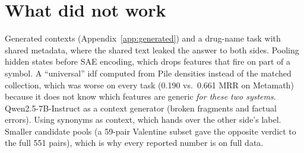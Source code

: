 \documentclass[11pt]{article}
\newcommand{\method}{SAE\mbox{-}IDF\xspace}
\begin{document}
\begin{table}[H]
  \centering\scriptsize
  \setlength{\tabcolsep}{3.5pt}
  
  \caption{Paired bootstrap over queries (10,000 resamples): mean difference \method minus baseline, 95\% interval, and one-sided bootstrap $p$-value. Valentine has no string baseline.}
  \label{tab:significance}
\end{table}

\begin{table}[H]
  \centering\scriptsize
  \setlength{\tabcolsep}{3.5pt}
  
  \caption{The same paired bootstrap for the Llama-3.1-8B runs (layer 15, Llama Scope 131k).}
  \label{tab:significancellama}
\end{table}

{\scriptsize\setlength{\tabcolsep}{3.5pt}\setlength{\LTcapwidth}{\textwidth}
}

\section{What did not work}
\label{app:tacit}

Generated contexts (Appendix~\ref{app:generated}) and a drug-name task with shared metadata, where the shared text leaked the answer to both sides.
Pooling hidden states before SAE encoding, which drops features that fire on part of a symbol.
A ``universal'' idf computed from Pile densities instead of the matched collection, which was worse on every task (0.190 vs.\ 0.661 MRR on Metamath) because it does not know which features are generic \emph{for these two systems}.
Qwen2.5-7B-Instruct as a context generator (broken fragments and factual errors).
Using synonyms as context, which hands over the other side's label.
Smaller candidate pools (a 59-pair Valentine subset gave the opposite verdict to the full 551 pairs), which is why every reported number is on full data.
\end{document}
